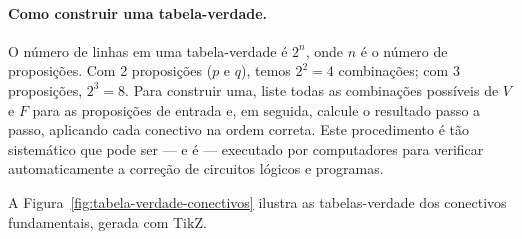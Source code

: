 \paragraph{Como construir uma tabela-verdade.} O número de linhas em uma
tabela-verdade é $2^n$, onde $n$ é o número de proposições. Com 2
proposições ($p$ e $q$), temos $2^2 = 4$ combinações; com 3 proposições,
$2^3 = 8$. Para construir uma, liste todas as combinações possíveis de $V$
e $F$ para as proposições de entrada e, em seguida, calcule o resultado
passo a passo, aplicando cada conectivo na ordem correta. Este procedimento
é tão sistemático que pode ser — e é — executado por computadores para
verificar automaticamente a correção de circuitos lógicos e programas.

A Figura~\ref{fig:tabela-verdade-conectivos} ilustra as tabelas-verdade dos
conectivos fundamentais, gerada com TikZ.

